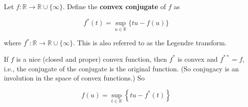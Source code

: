 \documentclass{report}
\begin{document}
\begin{definition}
    Let $f: \mathbb{R} \rightarrow \mathbb{R} \cup\{\infty\}$. Define the \textbf{convex conjugate} of $f$ as

    $$
    f^{*}(t)=\sup _{u \in \mathbb{R}}\{t u-f(u)\}
    $$

    where $f^{*}: \mathbb{R} \rightarrow \mathbb{R} \cup\{\infty\}$. This is also referred to as the Legendre transform.

    If $f$ is a nice (closed and proper) convex function, then $f^{*}$ is convex and $f^{* *}=f$, i.e., the conjugate of the conjugate is the original function. (So conjugacy is an involution in the space of convex functions.) So

    $$
    f(u)=\sup _{t \in \mathbb{R}}\left\{t u-f^{*}(t)\right\}
    $$
\end{definition}
\end{document}
